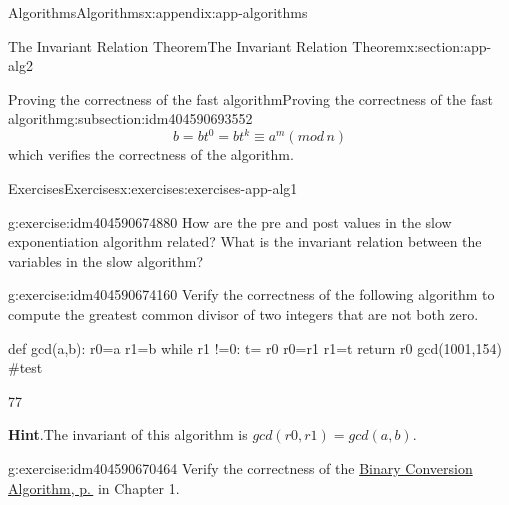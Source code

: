 \documentclass[twoside,10pt,]{book}
\newcommand{\blocktitlefont}{\relax}
\numberwithin{equation}{section}
\begin{document}
\begin{appendixptx}{Algorithms}{}{Algorithms}{}{}{x:appendix:app-algorithms}
\begin{sectionptx}{The Invariant Relation Theorem}{}{The Invariant Relation Theorem}{}{}{x:section:app-alg2}
\begin{subsectionptx}{Proving the correctness of the fast algorithm}{}{Proving the correctness of the fast algorithm}{}{}{g:subsection:idm404590693552}
\begin{equation*}
b = b t^0 = b t^k \equiv a^m(mod\,n)
\end{equation*}
which verifies the correctness of the algorithm.%
\end{subsectionptx}
%
%
\typeout{************************************************}
\typeout{************************************************}
%
\begin{exercises-subsection}{Exercises}{}{Exercises}{}{}{x:exercises:exercises-app-alg1}
\begin{divisionexercise}{1}{}{}{g:exercise:idm404590674880}%
How are the pre and post values in the slow exponentiation algorithm related? What is the invariant relation between the variables in the slow algorithm?%
\end{divisionexercise}%
\begin{divisionexercise}{2}{}{}{g:exercise:idm404590674160}%
Verify the correctness of the following algorithm to compute the greatest common divisor of two integers that are not both zero.%
\begin{sageinput}
def gcd(a,b):
    r0=a
    r1=b
    while r1 !=0:
        t= r0 %
        r0=r1
        r1=t
    return r0
gcd(1001,154)  #test
\end{sageinput}
\begin{sageoutput}
77
\end{sageoutput}
\par\smallskip%
\noindent\textbf{\blocktitlefont Hint}.\label{g:hint:idm404590671312}{}\hypertarget{g:hint:idm404590671312}{}\quad{}The invariant of this algorithm is \(gcd(r0,r1)=gcd(a,b)\).%
\end{divisionexercise}%
\begin{divisionexercise}{3}{}{}{g:exercise:idm404590670464}%
Verify the correctness of the \hyperref[x:algorithm:binary-conversion-algorithm]{Binary Conversion Algorithm, p.\,\pageref{x:algorithm:binary-conversion-algorithm}} in Chapter 1.%
\end{divisionexercise}%
\end{exercises-subsection}
\end{sectionptx}
\end{appendixptx}
%
%
\typeout{************************************************}
\typeout{************************************************}
%
\end{document}
